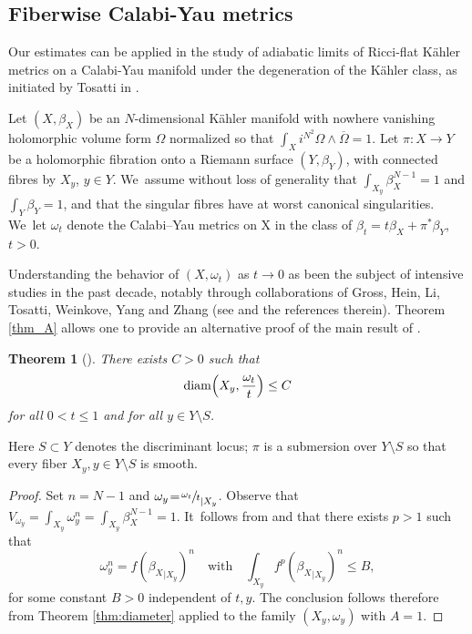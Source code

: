 \documentclass[JEP,XML,SOM,Unicode,published]{cedram}
\DeclareMathOperator{\diam}{diam}
\newtheorem{theorem}{Theorem}[section]
\theoremstyle{definition}
\begin{document}
\subsection{Fiberwise Calabi-Yau metrics} \label{sec:ke}

Our estimates can be applied in
the study of adiabatic limits of Ricci-flat Kähler metrics on a Calabi-Yau manifold
under the degeneration of the Kähler class, as initiated by Tosatti in \cite{Tos10}.

Let $(X,\beta_X)$ be an $N$-dimensional Kähler manifold with nowhere vanishing holomorphic volume form $\Omega$
normalized so that $\int_X i^{N^2} \Omega \wedge \overline{\Omega}=1$.
Let $\pi:X \rightarrow Y$ be a holomorphic fibration onto a Riemann surface $(Y,\beta_Y)$, with connected fibres
by $X_y$, $y \in Y$. We~assume without loss of generality that $\int_{X_y} \beta_X^{N-1}=1$ and $\int_Y \beta_Y=1$,
and that the singular fibres have at worst canonical singularities. We~let $\omega_t$ denote the Calabi–Yau metrics on X in the class of
$\beta_t=t\beta_X+ \pi^*\beta_Y$, $t>0$.

Understanding the behavior of $(X,\omega_t)$ as $t \rightarrow 0$ as been the subject of intensive studies
in the past decade, notably through collaborations of
Gross, Hein, Li, Tosatti, Weinkove, Yang and Zhang (see \cite{Tos20} and the references therein).
Theorem \ref{thm_A} allows one to provide an alternative proof of the main result of \cite{Li23}.

\begin{theorem}[{\cite[Th.\,1.4]{Li23}}]
There exists $C>0$ such that
\[
\diam \Bigl(X_y, \frac{\omega_t}{t} \Bigr) \leq C
\]
for all $0<t \leq 1$ and for all $y \in Y\setminus S$.
\end{theorem}

Here $S\subset Y$ denotes the discriminant locus; $\pi$ is a submersion over $Y\setminus S$ so that every fiber $X_y, y\in Y\setminus S$ is smooth.

\begin{proof}
Set $n\!=\!N-1$ and $\omega_y\!=\!{{\sfrac{\omega_t}{t}}}_{|X_y}$.
Observe that $V_{\omega_y}\!=\!\int_{X_y} \omega_y^n\!=\!\int_{X_y} \beta_X^{N-1}\!=\!1$. It~follows from \cite[Prop.\,2.3]{Li23} and \cite[Lem.\,4.4]{DnGG23} that there exists $p>1$ such that
\[
\omega_y^n =f ({\beta_X}_{|X_y})^n
\quad \text{with} \quad
\int_{X_y} f^p ({\beta_X}_{|X_y})^n \leq B,
\]
for some constant $B>0$ independent of $t,y$.
The conclusion follows therefore from Theorem \ref{thm:diameter}
applied to the family $(X_y,\omega_y)$ with $A=1$.
\end{proof}

\backmatter


\end{document}
